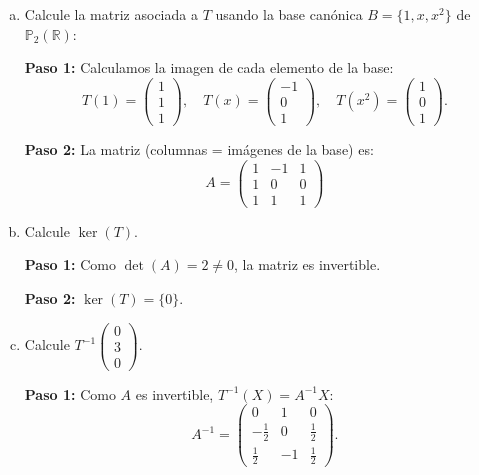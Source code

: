 \begin{example}
\begin{enumerate}[a.]
\begin{myproof}
    \textbf{Paso 3:} $\boxed{T \text{ es transformación lineal}}$.
    \end{myproof}

    \item Calcule la matriz asociada a $T$ usando la base canónica $B = \{1, x, x^2\}$ de $\mathbb{P}_2(\mathbb{R})$:
    \begin{myproof}
    \textbf{Paso 1:} Calculamos la imagen de cada elemento de la base:
    \[
    T(1) = \begin{pmatrix} 1 \\ 1 \\ 1 \end{pmatrix}, \quad
    T(x) = \begin{pmatrix} -1 \\ 0 \\ 1 \end{pmatrix}, \quad
    T(x^2) = \begin{pmatrix} 1 \\ 0 \\ 1 \end{pmatrix}.
    \]

    \textbf{Paso 2:} La matriz (columnas = imágenes de la base) es:
    \[
    \boxed{A = \begin{pmatrix}
        1 & -1 & 1 \\
        1 & 0 & 0 \\
        1 & 1 & 1
    \end{pmatrix}}
    \]
    \end{myproof}
    \item Calcule $\ker(T)$.
    \begin{myproof}
    \textbf{Paso 1:} Como $\det(A) = 2 \neq 0$, la matriz es invertible.

    \textbf{Paso 2:} $\boxed{\ker(T) = \{0\}}$.
    \end{myproof}

    \item Calcule $T^{-1} \begin{pmatrix} 0 \\ 3 \\ 0 \end{pmatrix}$.
    \begin{myproof}
    \textbf{Paso 1:} Como $A$ es invertible, $T^{-1}(X) = A^{-1} X$:
    \[
    A^{-1} = \begin{pmatrix}
        0 & 1 & 0 \\
        -\frac{1}{2} & 0 & \frac{1}{2} \\
        \frac{1}{2} & -1 & \frac{1}{2}
    \end{pmatrix}.
    \]


\end{myproof}
\end{enumerate}
\end{example}
